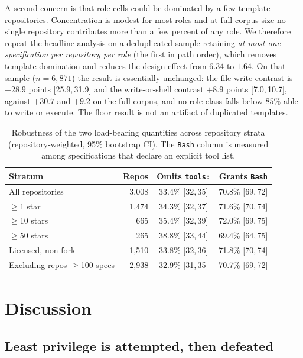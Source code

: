 \documentclass[smallextended,natbib]{svjour3}
\newcommand{\code}[1]{\texttt{\small #1}}
\newcommand{\ci}[2]{{\small[#1,\,#2]}}
\begin{document}
A second concern is that role cells could be dominated by a few template repositories. Concentration
is modest for most roles and at full corpus size no single repository contributes more than a few
percent of any role. We therefore repeat the headline analysis on a deduplicated sample retaining
\emph{at most one specification per repository per role} (the first in path order), which removes
template domination and reduces the design effect from $6.34$ to $1.64$. On that sample
($n=6{,}871$) the result is essentially unchanged: the file-write contrast is $+28.9$ points
\ci{25.9}{31.9} and the write-or-shell contrast $+8.9$ points \ci{7.0}{10.7}, against $+30.7$ and
$+9.2$ on the full corpus, and no role class falls below $85\%$ able to write or execute. The floor
result is not an artifact of duplicated templates.

\begin{table}[t]
\caption{Robustness of the two load-bearing quantities across repository strata
(repository-weighted, 95\% bootstrap CI). The \code{Bash} column is measured among specifications
that declare an explicit tool list.}
\label{tab:robust}
\small
\begin{tabular}{@{}lrcc@{}}
\toprule
\textbf{Stratum} & \textbf{Repos} & \textbf{Omits \code{tools:}} & \textbf{Grants \code{Bash}} \\
\midrule
All repositories               & 3{,}008 & 33.4\% \ci{32}{35} & 70.8\% \ci{69}{72} \\
$\geq$1 star                   & 1{,}474 & 34.3\% \ci{32}{37} & 71.6\% \ci{70}{74} \\
$\geq$10 stars                 &    665 & 35.4\% \ci{32}{39} & 72.0\% \ci{69}{75} \\
$\geq$50 stars                 &    265 & 38.8\% \ci{33}{44} & 69.4\% \ci{64}{75} \\
Licensed, non-fork             & 1{,}510 & 33.8\% \ci{32}{36} & 71.8\% \ci{70}{74} \\
Excluding repos $\geq$100 specs& 2{,}938 & 32.9\% \ci{31}{35} & 70.7\% \ci{69}{72} \\
\bottomrule
\end{tabular}
\end{table}

\section{Discussion}
\label{sec:discussion}

\subsection{Least privilege is attempted, then defeated}
\end{document}
